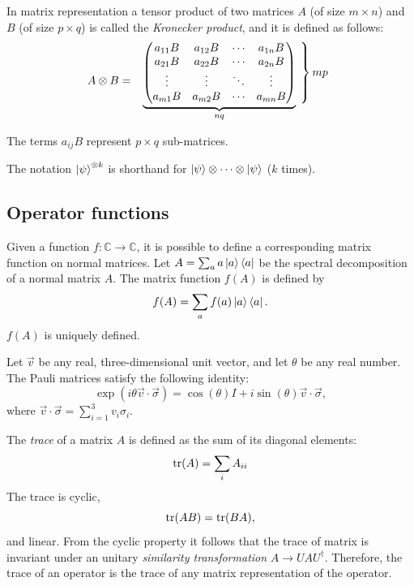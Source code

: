In matrix representation a tensor product of two matrices $A$ (of size $m \times n$) and $B$ (of size $p \times q$) is called the \emph{Kronecker product},
and it is defined as follows:
\[
A \otimes B =
\begin{array}{c@{\;}c@{\;}c}
&
\underbrace{
\begin{pmatrix}
    a_{11}B & a_{12}B & \cdots & a_{1n}B \\
    a_{21}B & a_{22}B & \cdots & a_{2n}B \\
    \vdots & \vdots & \ddots & \vdots \\
    a_{m1}B & a_{m2}B & \cdots & a_{mn}B
\end{pmatrix}
}_{nq}
&
\left.\vphantom{
\begin{pmatrix}
    a_{11}B & a_{12}B & \cdots & a_{1n}B \\
    a_{21}B & a_{22}B & \cdots & a_{2n}B \\
    \vdots & \vdots & \ddots & \vdots \\
    a_{m1}B & a_{m2}B & \cdots & a_{mn}B
\end{pmatrix}
}\right\} mp
\end{array}
\]

The terms $a_{ij}B$ represent $p\times q$ sub-matrices.

The notation $\ket{\psi}^{\otimes k}$ is shorthand for $\ket{\psi} \otimes \cdots \otimes \ket{\psi}$ ($k$ times).

\subsection{Operator functions}
Given a function $f: \mathbb{C} \to \mathbb{C}$,
it is possible to define a corresponding matrix function on normal matrices.
Let $A = \sum_a a\ket{a}\bra{a}$ be the spectral decomposition of a normal matrix $A$.
The matrix function $f(A)$ is defined by
\[
    f(A) = \sum_a f(a)\ket{a}\bra{a}.
\]
$f(A)$ is uniquely defined.

Let $\vec{v}$ be any real, three-dimensional unit vector, and let $\theta$ be any real number.
The Pauli matrices satisfy the following identity:
\[
    \exp\left(i\theta \vec{v} \cdot \vec{\sigma}\right) = \cos(\theta)I + i\sin(\theta)\vec{v} \cdot \vec{\sigma},
\]
where $\vec{v} \cdot \vec{\sigma} = \sum_{i=1}^3 v_i \sigma_i$.

The \emph{trace} of a matrix $A$ is defined as the sum of its diagonal elements:
\[
    \operatorname{tr}(A) = \sum_i A_{ii}
\]
The trace is cyclic,
\[
    \operatorname{tr}(AB) = \operatorname{tr}(BA),
\]
and linear.
From the cyclic property it follows that the trace of matrix is invariant under an unitary \emph{similarity transformation} $A \to UAU^\dagger$.
Therefore, the trace of an operator is the trace of any matrix representation of the operator.

